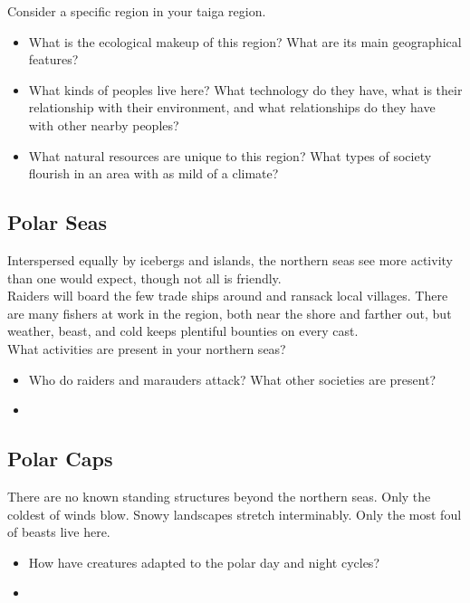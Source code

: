 \documentclass[notitlepage]{article}
\begin{document}
\begin{multicols}{2}
Consider a specific region in your taiga region.

\begin{itemize}
\item What is the ecological makeup of this region? What are its main geographical features?
\item What kinds of peoples live here? What technology do they have, what is their relationship with their environment, and what relationships do they have with other nearby peoples?
\item What natural resources are unique to this region? What types of society flourish in an area with as mild of a climate?
\end{itemize}

\subsection{Polar Seas} Interspersed equally by icebergs and islands, the northern seas see more activity than one would expect, though not all is friendly. \\

Raiders will board the few trade ships around and ransack local villages. There are many fishers at work in the region, both near the shore and farther out, but weather, beast, and cold keeps plentiful bounties on every cast. \\

What activities are present in your northern seas?

\begin{itemize}
\item Who do raiders and marauders attack? What other societies are present?
\item 
\end{itemize}

\subsection{Polar Caps}

There are no known standing structures beyond the northern seas. Only the coldest of winds blow. Snowy landscapes stretch interminably. Only the most foul of beasts live here.

\begin{itemize}
\item How have creatures adapted to the polar day and night cycles?
\item 
\end{itemize}


\end{multicols}
\end{document}

